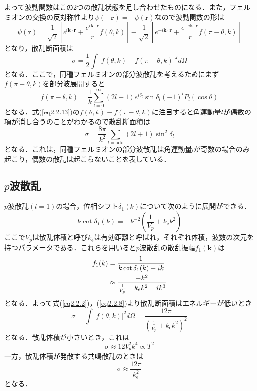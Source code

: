 \documentclass[11pt,a4j,notitlepage]{jreport}
\begin{document}
よって波動関数はこの2つの散乱状態を足し合わせたものになる．また，フェルミオンの交換の反対称性より$\psi( -\bm{r} )= -\psi(\bm{r})$なので波動関数の形は
\begin{equation}
 	\psi(\bm{r})=\frac{1}{\sqrt{2}}\left[e^{i \bm{k} \cdot \bm{r}}+\frac{e^{i \bm{k} \cdot \bm{r}}}{r} f\left(\theta, k\right)\right] - \frac{1}{\sqrt{2}}\left[e^{-i \bm{k} \cdot \bm{r}}+\frac{e^{-i \bm{k} \cdot \bm{r}}}{r} f\left(\pi - \theta, k\right)\right]
	\label{eq2.2.13}
\end{equation}
となり，散乱断面積は
\begin{equation}
	\sigma=\frac{1}{2} \int|f(\theta, k) - f(\pi-\theta, k)|^{2} d \Omega
	\label{eq2.2.14}
\end{equation}
となる．ここで，同種フェルミオンの部分波散乱を考えるためにまず$f(\pi - \theta, k)$を部分波展開すると
\begin{equation}
	f(\pi - \theta, k)=\frac{1}{k} \sum_{l=0}^{\infty}(2 l+1) e^{i \delta_{l}} \sin \delta_{l} (-1)^l P_{l}(\cos \theta)
	\label{eq2.2.15}
\end{equation}
となる．式(\ref{eq2.2.13})の$f(\theta, k) - f(\pi-\theta, k)$に注目すると角運動量$l$が偶数の項が消し合うのことがわかるので散乱断面積は
\begin{equation}
	\sigma = \frac{8 \pi}{k^{2}} \sum_{l=\mathrm{odd}}(2 l+1) \sin ^{2} \delta_{l}
	\label{eq2.2.16}
\end{equation}
となる．これは，同種フェルミオンの部分波散乱は角運動量$l$が奇数の場合のみ起こり，偶数の散乱は起こらないことを表している．

\subsection{$p$波散乱}
$p$波散乱$(l=1)$の場合，位相シフト$\delta_{1}(k)$について次のように展開ができる\cite{InaD}\cite{Waseem}．
\begin{equation}
	k \cot \delta_{1}(k) = - k^{-2} \left( \frac{1}{V_p} + k_{\mathrm e} k^2 \right)
	\label{eq2.2.17}
\end{equation}
ここで$V_p$は散乱体積と呼び$k_{\mathrm e}$は有効距離と呼ばれ，それぞれ体積，波数の次元を持つパラメータである．これらを用いると$p$波散乱の散乱振幅$f_1(\bm{k})$は
\begin{align}
	f_{1}(k)
	& = \frac{1}{k \cot \delta_{1}(k) - i k} \notag \\
	& \approx \frac{-k^{2}}{\frac{1}{V_p} + k_{\mathrm e} k^2 +i k^3}
	\label{eq2.2.18}
\end{align}
となる．よって式(\ref{eq2.2.2})，(\ref{eq2.2.8})より散乱断面積はエネルギーが低いとき
\begin{equation}
	\sigma=\int|f(\theta, k)|^{2} d \Omega = \frac{12 \pi}{\left( \frac{1}{V_p} + k_{\mathrm e} k^2 \right)^{2}}
	\label{eq2.2.19}
\end{equation}
となる．散乱体積が小さいとき，これは
\begin{equation}
	\sigma \approx 12 V^2_p k^4 \propto T^2
	\label{eq2.2.20}
\end{equation}
一方，散乱体積が発散する共鳴散乱のときは
\begin{equation}
	\sigma \approx \frac{12 \pi}{k_{\mathrm e}^{2}}
	\label{eq2.2.21}
\end{equation}
となる．
\end{document}
